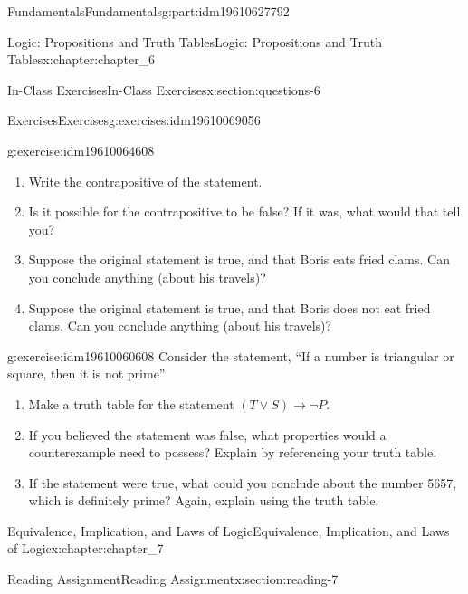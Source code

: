 \documentclass[oneside,10pt,]{book}
\numberwithin{equation}{section}
\begin{document}
\begin{partptx}{Fundamentals}{}{Fundamentals}{}{}{g:part:idm19610627792}
\begin{chapterptx}{Logic: Propositions and Truth Tables}{}{Logic: Propositions and Truth Tables}{}{}{x:chapter:chapter_6}
\begin{sectionptx}{In-Class Exercises}{}{In-Class Exercises}{}{}{x:section:questions-6}
\begin{exercises-subsection-numberless}{Exercises}{}{Exercises}{}{}{g:exercises:idm19610069056}
\begin{exercisegroup}
\begin{divisionexerciseeg}{3}{}{}{g:exercise:idm19610064608}
\begin{enumerate}[label=(\alph*)]
\item{}Write the contrapositive of the statement.%
\item{}Is it possible for the contrapositive to be false? If it was, what would that tell you?%
\item{}Suppose the original statement is true, and that Boris eats fried clams. Can you conclude anything (about his travels)?%
\item{}Suppose the original statement is true, and that Boris does not eat fried clams. Can you conclude anything (about his travels)?%
\end{enumerate}
%
\end{divisionexerciseeg}%
\begin{divisionexerciseeg}{4}{}{}{g:exercise:idm19610060608}%
Consider the statement, ``If a number is triangular or square, then it is not prime''%
\begin{enumerate}[label=(\alph*)]
\item{}Make a truth table for the statement \((T \vee S) \rightarrow \neg P\).%
\item{}If you believed the statement was false, what properties would a counterexample need to possess? Explain by referencing your truth table.%
\item{}If the statement were true, what could you conclude about the number 5657, which is definitely prime? Again, explain using the truth table.%
\end{enumerate}
%
\end{divisionexerciseeg}%
\end{exercisegroup}
\par\medskip\noindent
\end{exercises-subsection-numberless}
\end{sectionptx}
\end{chapterptx}
%
\typeout{************************************************}
\typeout{************************************************}
%
\begin{chapterptx}{Equivalence, Implication, and Laws of Logic}{}{Equivalence, Implication, and Laws of Logic}{}{}{x:chapter:chapter_7}
%
%
%
%
%
\typeout{************************************************}
\typeout{************************************************}
%
\begin{sectionptx}{Reading Assignment}{}{Reading Assignment}{}{}{x:section:reading-7}

\end{sectionptx}
\end{chapterptx}
\end{partptx}
\end{document}
